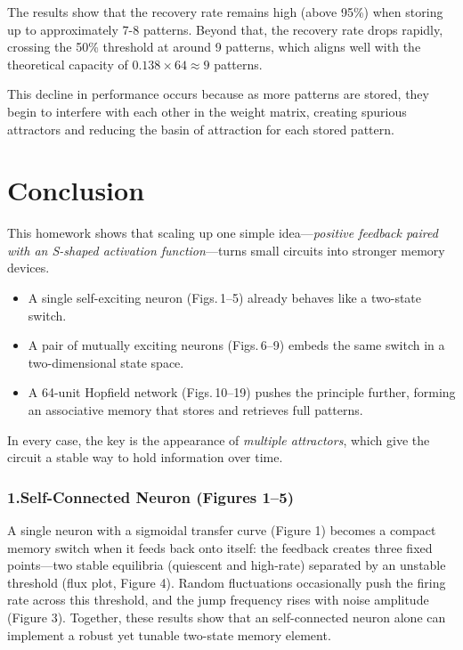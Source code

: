 \documentclass{article}
\begin{document}
The results show that the recovery rate remains high (above 95\%) when storing up to approximately 7-8 patterns. Beyond that, the recovery rate drops rapidly, crossing the 50\% threshold at around 9 patterns, which aligns well with the theoretical capacity of $0.138 \times 64 \approx 9$ patterns.

This decline in performance occurs because as more patterns are stored, they begin to interfere with each other in the weight matrix, creating spurious attractors and reducing the basin of attraction for each stored pattern.



\section{Conclusion}

This homework shows that scaling up one simple idea—\emph{positive feedback paired with an S-shaped activation function}—turns small circuits into stronger memory devices.  
\begin{itemize}
    \item A single self-exciting neuron (Figs.\,1–5) already behaves like a two-state switch.  
    \item A pair of mutually exciting neurons (Figs.\,6–9) embeds the same switch in a two-dimensional state space.  
    \item A 64-unit Hopfield network (Figs.\,10–19) pushes the principle further, forming an associative memory that stores and retrieves full patterns.  
\end{itemize}
In every case, the key is the appearance of \emph{multiple attractors}, which give the circuit a stable way to hold information over time.

\subsubsection*{1.\;Self-Connected Neuron (Figures 1–5)}
A single neuron with a sigmoidal transfer curve (Figure 1) becomes a compact memory switch when it feeds back onto itself: the feedback creates three fixed points—two stable equilibria (quiescent and high-rate) separated by an unstable threshold (flux plot, Figure 4). Random fluctuations occasionally push the firing rate across this threshold, and the jump frequency rises with noise amplitude (Figure 3). Together, these results show that an self-connected neuron alone can implement a robust yet tunable two-state memory element.
\end{document}
